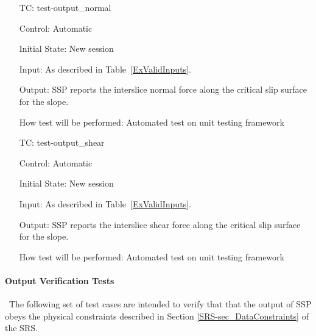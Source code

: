 \documentclass[12pt, titlepage]{article}
\newcounter{testnum} %
\newcommand{\progname}{SSP}
\begin{document}
\begin{enumerate}[label=TC\arabic*:,ref={\arabic*}]
Output: \progname{} reports the coordinates of the critical slip surface for 
the slope.

How test will be performed: Automated test on unit testing framework

\item [TC\refstepcounter{testnum}\thetestnum: \label{TC_OutNormal}] 
test-output\_normal

Control: Automatic

Initial State: New session

Input: As described in Table~\ref{ExValidInputs}.

Output: \progname{} reports the interslice normal force along the critical slip 
surface for the slope.

How test will be performed: Automated test on unit testing framework

\item [TC\refstepcounter{testnum}\thetestnum: \label{TC_OutShear}] 
test-output\_shear

Control: Automatic

Initial State: New session

Input: As described in Table~\ref{ExValidInputs}.

Output: \progname{} reports the interslice shear force along the critical slip 
surface for the slope.

How test will be performed: Automated test on unit testing framework
	
\end{enumerate}

\paragraph{Output Verification Tests}

~\newline \noindent The following set of test cases are intended to 
verify that that the output of \progname{} obeys the physical constraints 
described in Section \ref{SRS-sec_DataConstraints} of the SRS.
\end{document}
